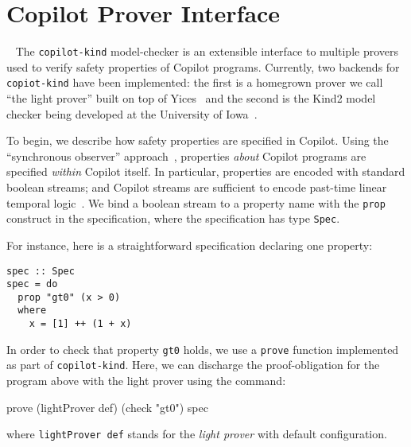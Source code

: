 \section{Copilot Prover Interface}~\label{sec:prover} 
The \texttt{copilot-kind} model-checker is an extensible interface to multiple
provers used to verify safety properties of Copilot
programs. Currently, two backends for \texttt{copiot-kind} have been implemented: the first is a
homegrown prover we call ``the light prover'' built on top of
Yices~\cite{Dutertre:cav2014} and the second is the Kind2 model checker being developed at
the University of Iowa~\cite{kind}.

To begin, we describe how safety properties are specified in Copilot. Using the
``synchronous observer'' approach~\cite{amast93}, properties \emph{about}
Copilot programs are specified \emph{within} Copilot itself. In particular,
properties are encoded with standard boolean streams; and Copilot streams are
sufficient to encode past-time linear temporal logic~\cite{ptltl}. We bind a boolean stream
to a property name with the \texttt{prop} construct in the specification, where
the specification has type \texttt{Spec}. 

For instance, here is a straightforward specification declaring one
property:

\begin{lstlisting}[frame=single]
spec :: Spec
spec = do
  prop "gt0" (x > 0)
  where
    x = [1] ++ (1 + x)
\end{lstlisting}

In order  to check that property \texttt{gt0} holds, we use a \texttt{prove}
function implemented as part of \texttt{copilot-kind}.
Here, we can discharge the proof-obligation for the program above with the light prover using the command:
\begin{code}
prove (lightProver def) (check "gt0") spec
\end{code}
where \texttt{lightProver def} stands for the \emph{light prover} with
default configuration.


